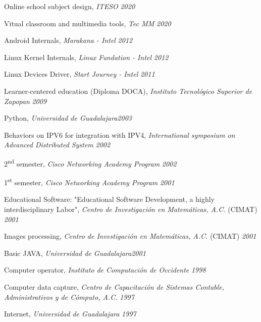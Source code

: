 
\begin{loneinnerlist}
  \item Online school subject design, \emph{ITESO} \hfill{\emph{2020}}
  \item Vitual classroom and multimedia tools, \emph{Tec MM} \hfill{\emph{2020}}
  \item Android Internals, \emph{Marakana - Intel} \hfill{\emph{2012}}
  \item Linux Kernel Internals, \emph{Linux Fundation - Intel} \hfill{\emph{2012}}
  \item Linux Devices Driver, \emph{Start Journey - Intel} \hfill{\emph{2011}}
  \item Learner-centered education (Diploma DOCA),
        \emph{Instituto Tecnológico Superior de Zapopan} \hfill{\emph{2009}}
  \item Python, \emph{Universidad de Guadalajara}\hfill{\emph{2003}}
  \item Behaviors on IPV6 for integration with IPV4, \emph{International
        symposium on Advanced Distributed System} \hfill{\emph{2002}}
  \item 2\textsuperscript{nd} semester, \emph{Cisco Networking Academy
        Program} \hfill{\emph{2002}}
  \item 1\textsuperscript{st} semester, \emph{Cisco Networking Academy
        Program} \hfill{\emph{2001}}
  \item Educational Software: "Educational Software Development, a
        highly interdisciplinary Labor", \emph{Centro de Investigación
        en Matemáticas, A.C.} (CIMAT) \hfill{\emph{2001}}
  \item Images processing, \emph{Centro de Investigación
        en Matemáticas, A.C.} (CIMAT) \hfill{\emph{2001}}
  \item Basic JAVA, \emph{Universidad de Guadalajara}\hfill{\emph{2001}}
  \item Computer operator, \emph{Instituto de Computación de
        Occidente} \hfill{\emph{1998}}
  \item Computer data capture, \emph{Centro de Capacitación de Sistemas
        Contable, Administrativos y de Cómputo, A.C.} \hfill{\emph{1997}}
  \item Internet, \emph{Universidad de Guadalajara} \hfill{\emph{1997}}
\end{loneinnerlist}
